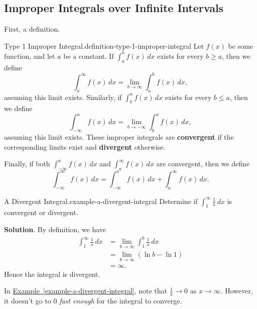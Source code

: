 \documentclass[10pt,]{book}
\newcommand{\terminology}[1]{\textbf{#1}}
\numberwithin{equation}{section}
\begin{document}
\subsection[{Improper Integrals over Infinite Intervals}]{Improper Integrals over Infinite Intervals}\label{subsection-improper-integrals-over-infinite-intervals}
\hypertarget{p-579}{}%
First, a definition.%
\begin{definition}{Type 1 Improper Integral.}{definition-type-1-improper-integral}%
\hypertarget{p-580}{}%
Let \(f(x)\) be some function, and let \(a\) be a constant. If \(\int_{a}^{b}f(x)\,dx\) exists for every \(b\geq a\), then we define%
\begin{equation*}
\int_{a}^{\infty}f(x)\,dx = \lim_{b\to\infty}\int_{a}^{b}f(x)\,dx,
\end{equation*}
assuming this limit exists. Similarly, if \(\int_{b}^{a}f(x)\,dx\) exists for every \(b\leq a\), then we define%
\begin{equation*}
\int_{-\infty}^{a}f(x)\,dx = \lim_{b\to-\infty}\int_{b}^{a}f(x)\,dx,
\end{equation*}
assuming this limit exists. These improper integrals are \terminology{convergent} if the corresponding limits exist and \terminology{divergent} otherwise.%
\par
\hypertarget{p-581}{}%
Finally, if both \(\int_{-\infty}^{a}f(x)\,dx\) and \(\int_{a}^{\infty}f(x)\,dx\) are convergent, then we define%
\begin{equation*}
\int_{-\infty}^{\infty}f(x)\,dx = \int_{-\infty}^{a}f(x)\,dx + \int_{a}^{\infty}f(x)\,dx.
\end{equation*}
%
\end{definition}
\begin{example}{A Divergent Integral.}{example-a-divergent-integral}%
\hypertarget{p-582}{}%
Determine if \(\int_{1}^{\infty}\frac{1}{x}\,dx\) is convergent or divergent.%
\par\smallskip%
\noindent\textbf{Solution}.\hypertarget{solution-126}{}\quad%
\hypertarget{p-583}{}%
By definition, we have%
\begin{align*}
\int_{1}^{\infty}\frac{1}{x}\,dx & = \lim_{b\to\infty}\int_{1}^{b}\frac{1}{x}\,dx \\
& = \lim_{b\to\infty}(\ln b - \ln 1) \\
& = \infty. 
\end{align*}
Hence the integral is divergent.%
\end{example}
\hypertarget{p-584}{}%
In \hyperref[example-a-divergent-integral]{Example~\ref{example-a-divergent-integral}}, note that \(\frac{1}{x}\to0\) as \(x\to\infty\). However, it doesn't go to \(0\) \emph{fast enough} for the integral to converge.%
\end{document}
